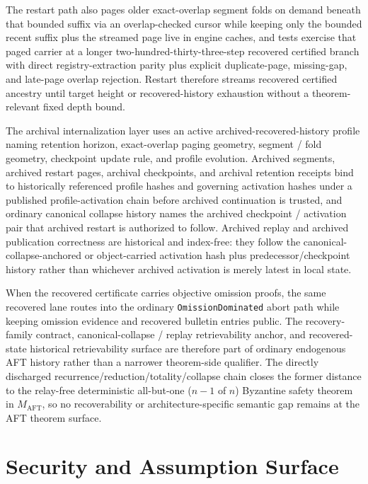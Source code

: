 \documentclass[11pt]{article}
\newcommand{\AFT}{\textsc{AFT}}
\newcommand{\code}[1]{\texttt{#1}}
\begin{document}
The restart path also pages older exact-overlap segment folds on demand beneath
that bounded suffix via an overlap-checked cursor while keeping only the
bounded recent suffix plus the streamed page live in engine caches, and tests
exercise that paged carrier at a longer two-hundred-thirty-three-step
recovered certified branch with direct registry-extraction parity plus explicit
duplicate-page, missing-gap, and late-page overlap rejection. Restart
therefore streams recovered certified ancestry until target height or
recovered-history exhaustion without a theorem-relevant fixed depth bound.

The archival internalization layer uses an active archived-recovered-history
profile naming retention horizon, exact-overlap paging geometry, segment /
fold geometry, checkpoint update rule, and profile evolution. Archived
segments, archived restart pages, archival checkpoints, and archival retention
receipts bind to historically referenced profile hashes and governing
activation hashes under a published profile-activation chain before archived
continuation is trusted, and ordinary canonical collapse history names the
archived checkpoint / activation pair that archived restart is authorized to
follow. Archived replay and archived publication correctness are historical and
index-free: they follow the canonical-collapse-anchored or object-carried
activation hash plus predecessor/checkpoint history rather than whichever
archived activation is merely latest in local state.

When the recovered certificate carries objective omission proofs, the same
recovered lane routes into the ordinary \code{OmissionDominated} abort path
while keeping omission evidence and recovered bulletin entries public. The
recovery-family contract, canonical-collapse / replay retrievability anchor, and
recovered-state historical retrievability surface are therefore part of ordinary endogenous
\AFT{} history rather than a narrower theorem-side qualifier. The directly
discharged recurrence/reduction/totality/collapse chain closes the former
distance to the relay-free deterministic all-but-one (\(n-1\) of \(n\))
Byzantine safety
theorem in \(M_{\mathrm{AFT}}\), so no recoverability or architecture-specific semantic
gap remains at the AFT theorem surface.

\section{Security and Assumption Surface}
\end{document}
